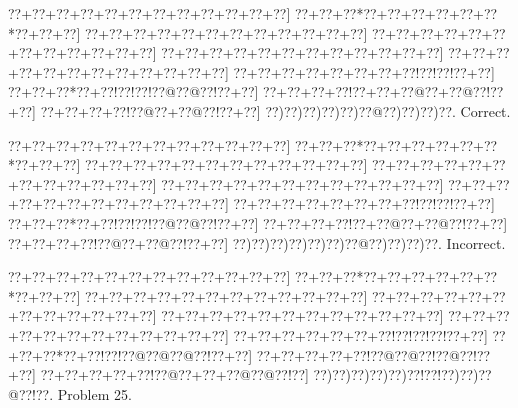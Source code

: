 \documentclass[a5paper]{article}
\begin{document}
\begin{center}
{\goo
\0??+\0??+\0??+\0??+\0??+\0??+\0??+\0??+\0??+\0??+\0??+\0??]
\0??+\0??+\0??*\0??+\0??+\0??+\0??+\0??+\0??*\0??+\0??+\0??]
\0??+\0??+\0??+\0??+\0??+\0??+\0??+\0??+\0??+\0??+\0??+\0??]
\0??+\0??+\0??+\0??+\0??+\0??+\0??+\0??+\0??+\0??+\0??+\0??]
\0??+\0??+\0??+\0??+\0??+\0??+\0??+\0??+\0??+\0??+\0??+\0??]
\0??+\0??+\0??+\0??+\0??+\0??+\0??+\0??+\0??+\0??+\0??+\0??]
\0??+\0??+\0??+\0??+\0??+\0??+\0??+\0??!\0??!\0??!\0??+\0??]
\0??+\0??+\0??*\0??+\0??!\0??!\0??!\0??@\0??@\0??!\0??+\0??]
\0??+\0??+\0??+\0??!\0??+\0??+\0??@\0??+\0??@\0??!\0??+\0??]
\0??+\0??+\0??+\0??!\0??@\0??+\0??@\0??!\0??+\0??]
\0??)\0??)\0??)\0??)\0??)\0??@\0??)\0??)\0??)\0??.
}
Correct. 

\end{center}
\begin{center}
{\goo
\0??+\0??+\0??+\0??+\0??+\0??+\0??+\0??+\0??+\0??+\0??+\0??]
\0??+\0??+\0??*\0??+\0??+\0??+\0??+\0??+\0??*\0??+\0??+\0??]
\0??+\0??+\0??+\0??+\0??+\0??+\0??+\0??+\0??+\0??+\0??+\0??]
\0??+\0??+\0??+\0??+\0??+\0??+\0??+\0??+\0??+\0??+\0??+\0??]
\0??+\0??+\0??+\0??+\0??+\0??+\0??+\0??+\0??+\0??+\0??+\0??]
\0??+\0??+\0??+\0??+\0??+\0??+\0??+\0??+\0??+\0??+\0??+\0??]
\0??+\0??+\0??+\0??+\0??+\0??+\0??+\0??!\0??!\0??!\0??+\0??]
\0??+\0??+\0??*\0??+\0??!\0??!\0??!\0??@\0??@\0??!\0??+\0??]
\0??+\0??+\0??+\0??!\0??+\0??@\0??+\0??@\0??!\0??+\0??]
\0??+\0??+\0??+\0??!\0??@\0??+\0??@\0??!\0??+\0??]
\0??)\0??)\0??)\0??)\0??)\0??)\0??@\0??)\0??)\0??)\0??.
}
Incorrect. 

\end{center}
\newpage
\begin{center}
{\goo
\0??+\0??+\0??+\0??+\0??+\0??+\0??+\0??+\0??+\0??+\0??+\0??]
\0??+\0??+\0??*\0??+\0??+\0??+\0??+\0??+\0??*\0??+\0??+\0??]
\0??+\0??+\0??+\0??+\0??+\0??+\0??+\0??+\0??+\0??+\0??+\0??]
\0??+\0??+\0??+\0??+\0??+\0??+\0??+\0??+\0??+\0??+\0??+\0??]
\0??+\0??+\0??+\0??+\0??+\0??+\0??+\0??+\0??+\0??+\0??+\0??]
\0??+\0??+\0??+\0??+\0??+\0??+\0??+\0??+\0??+\0??+\0??+\0??]
\0??+\0??+\0??+\0??+\0??+\0??+\0??!\0??!\0??!\0??!\0??+\0??]
\0??+\0??+\0??*\0??+\0??!\0??!\0??@\0??@\0??@\0??!\0??+\0??]
\0??+\0??+\0??+\0??+\0??!\0??@\0??@\0??!\0??@\0??!\0??+\0??]
\0??+\0??+\0??+\0??+\0??!\0??@\0??+\0??+\0??@\0??@\0??!\0??]
\0??)\0??)\0??)\0??)\0??)\0??!\0??!\0??)\0??)\0??@\0??!\0??.
}
Problem 25.

\end{center}
\end{document}
